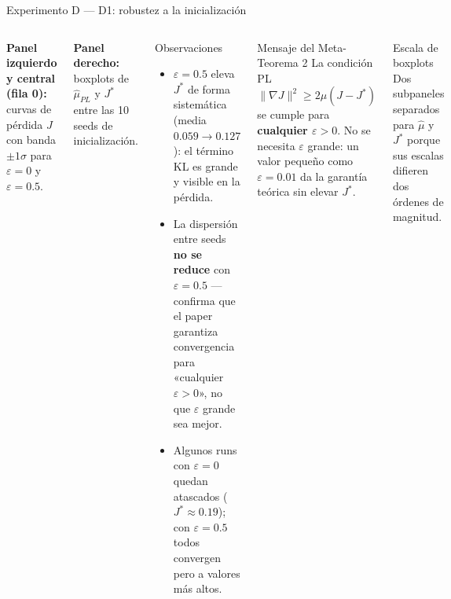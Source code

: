 \documentclass[10pt]{beamer}
\begin{document}
\begin{frame}{Experimento D — D1: robustez a la inicialización}

\begin{columns}
\small
\textbf{Panel izquierdo y central (fila 0):} curvas de pérdida $J$ con banda $\pm 1\sigma$ para $\varepsilon=0$ y $\varepsilon=0.5$.

\medskip
\textbf{Panel derecho:} boxplots de $\hat{\mu}_{PL}$ y $J^*$ entre las 10 seeds de inicialización.

\bigskip
\begin{block}{Observaciones}
\begin{itemize}
  \item $\varepsilon=0.5$ eleva $J^*$ de forma sistemática (media $0.059 \to 0.127$): el término KL es grande y visible en la pérdida.
  \item La dispersión entre seeds \textbf{no se reduce} con $\varepsilon=0.5$ — confirma que el paper garantiza convergencia para «cualquier $\varepsilon>0$», no que $\varepsilon$ grande sea mejor.
  \item Algunos runs con $\varepsilon=0$ quedan atascados ($J^*\approx 0.19$); con $\varepsilon=0.5$ todos convergen pero a valores más altos.
\end{itemize}
\end{block}

\begin{alertblock}{Mensaje del Meta-Teorema 2}
  La condición PL
  \[
    \|\nabla J\|^2 \geq 2\mu(J-J^*)
  \]
  se cumple para \textbf{cualquier $\varepsilon>0$}. No se necesita $\varepsilon$ grande: un valor pequeño como $\varepsilon=0.01$ da la garantía teórica sin elevar $J^*$.
\end{alertblock}

\medskip
\begin{block}{Escala de boxplots}
  Dos subpaneles separados para $\hat\mu$ y $J^*$ porque sus escalas difieren dos órdenes de magnitud.
\end{block}
\end{columns}

\end{frame}
\end{document}
